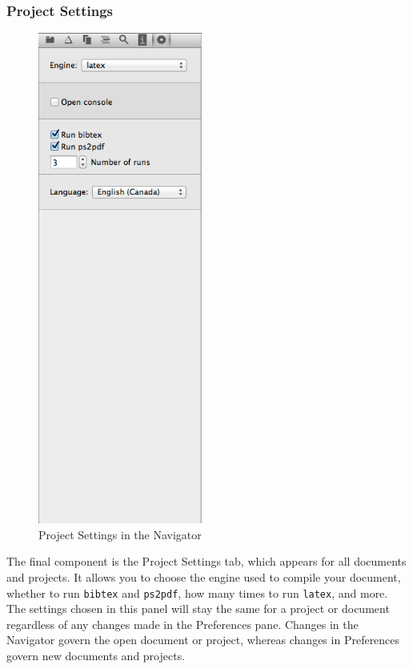 \subsubsection{Project Settings}
\begin{figure}
\includegraphics[width=0.48\textwidth, trim = 0 7.45in 0 0, clip = true]{TeXnicle-Images/texnicle-nav-projsettings.png}
\caption{Project Settings in the Navigator}
\label{fig:texnicle-nav-projsettings}
\end{figure}
The final component is the Project Settings tab, which appears for all documents and projects. It allows you to choose the engine used to compile your document, whether to run \verb|bibtex| and \verb|ps2pdf|, how many times to run \verb|latex|, and more. The settings chosen in this panel will stay the same for a project or document regardless of any changes made in the Preferences pane. Changes in the Navigator govern the open document or project, whereas changes in Preferences govern new documents and projects.
\pagebreak\clearpage

